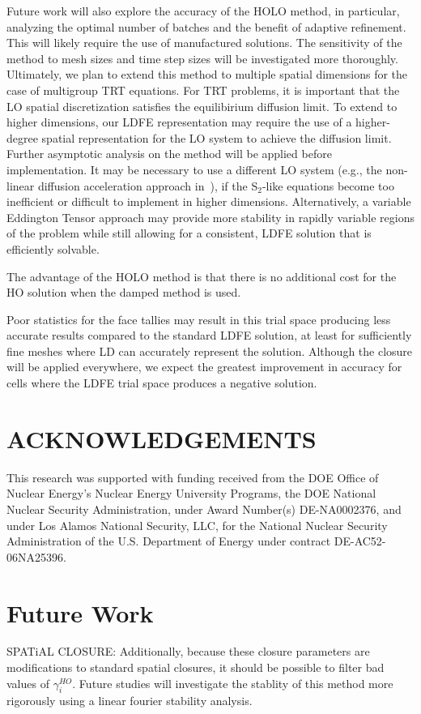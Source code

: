 Future work will also explore the accuracy of the HOLO method, in particular,
analyzing the optimal number of batches and the benefit of adaptive refinement.  This will likely
require the use of manufactured solutions.  The sensitivity of the method to mesh sizes and time step sizes will be
investigated more thoroughly.  
Ultimately, we plan to extend this method to multiple spatial dimensions for the 
case of multigroup TRT equations.  For TRT problems, it is important that
the LO spatial discretization satisfies the equilibirium diffusion limit.  To extend
to higher dimensions, our LDFE representation may require the use of a higher-degree
spatial representation for the LO system to achieve the diffusion
limit. Further asymptotic
analysis on the method will be applied before implementation. It may be necessary to use a different LO system (e.g., the non-linear diffusion
acceleration approach in~\cite{rmc}), if the S$_2$-like equations become too
inefficient or difficult to implement in higher dimensions.  Alternatively, a
variable Eddington Tensor approach may provide more stability in rapidly variable
regions of the problem while still allowing for a consistent, LDFE solution that is efficiently solvable.

The advantage of the HOLO method is that
there is no additional cost for the HO solution when the damped method is used.


Poor statistics for the face tallies may result in this trial space producing less
accurate results compared to the standard LDFE solution, at least for sufficiently fine meshes where LD
can accurately represent the solution.  Although the closure will be applied everywhere,
we expect the greatest improvement in accuracy for cells where the LDFE trial space
produces a negative solution.


\section*{ACKNOWLEDGEMENTS}

This research was supported with funding received from the DOE Office of Nuclear
Energy's Nuclear Energy University Programs, the DOE National
Nuclear Security Administration, under Award Number(s) DE-NA0002376, and under Los Alamos National Security,
LLC, for the National Nuclear Security Administration of the U.S. Department of
Energy under contract DE-AC52-06NA25396. 

\section{Future Work} 

SPATiAL CLOSURE:
Additionally, because these closure
parameters are modifications to standard spatial closures, it should be possible to filter bad
values of $\gamma^{HO}_i$.  Future studies will investigate the stablity of
this method more rigorously using a linear fourier stability analysis.

